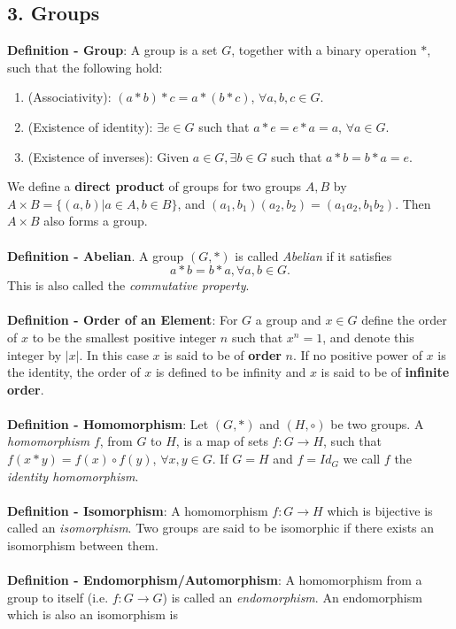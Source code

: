 \documentclass{article}
\begin{document}
\subsection*{3. Groups}
\textbf{Definition - Group}: A group is a set $G$, together with a binary
operation $*$, such that the following hold: \begin{enumerate}
    \item (Associativity): $(a * b) * c = a * (b * c)$, $\forall a, b, c \in G$.
    \item (Existence of identity): $\exists e \in G$ such that $a * e = e * a = a$, $\forall a \in G$.
    \item (Existence of inverses): Given $a \in G, \exists b \in G$ such that $a * b = b * a = e$.
\end{enumerate} $ $ \\
We define a \textbf{direct product} of groups for two groups $A, B$ by $A \times B = \{(a, b) | a \in A, b \in B\}$, and $(a_1, b_1)(a_2, b_2) = (a_1a_2, b_1b_2)$. Then $A \times B$ also forms a group. \\ \\
\textbf{Definition - Abelian}. A group $(G, *)$ is called \textit{Abelian} if it satisfies $$a * b = b * a, \forall a, b \in G.$$ This is also called the \textit{commutative property}. \\ \\
\textbf{Definition - Order of an Element}: For $G$ a group and $x \in G$ define the order of $x$ to be the smallest positive integer $n$ such that $x^n = 1$, and denote this integer by $|x|$. In this case $x$ is said to be of \textbf{order} $n$. If no positive power of $x$ is the identity, the order of $x$ is defined to be infinity and $x$ is said to be of \textbf{infinite order}. \\ \\
\textbf{Definition - Homomorphism}: Let $(G, *)$ and $(H, \circ)$ be two groups. A \textit{homomorphism} $f$, from $G$ to $H$, is a map of sets $f: G \rightarrow H$, such that $f(x * y) = f(x) \circ f(y)$, $\forall x, y \in G$. If $G = H$ and $f = Id_G$ we call $f$ the \textit{identity homomorphism}. \\ \\
\textbf{Definition - Isomorphism}: A homomorphism $f: G \rightarrow H$ which is bijective is called an \textit{isomorphism}. Two groups are said to be isomorphic if there exists an isomorphism between them. \\ \\
\textbf{Definition - Endomorphism/Automorphism}: A homomorphism from a group to itself (i.e. $f: G \rightarrow G$) is called an \textit{endomorphism}. An endomorphism which is also an isomorphism is
\end{document}
